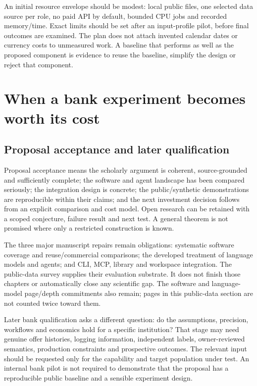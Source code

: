 An initial resource envelope should be modest: local public files, one
selected data source per role, no paid API by default, bounded CPU jobs
and recorded memory/time. Exact limits should be set after an
input-profile pilot, before final outcomes are examined. The plan does
not attach invented calendar dates or currency costs to unmeasured work.
A baseline that performs as well as the proposed component is evidence
to reuse the baseline, simplify the design or reject that component.

\hypertarget{pd15:investment}{%
\chapter{When a bank experiment becomes worth its
cost}\label{pd15:investment}}

\hypertarget{proposal-acceptance-and-later-qualification}{%
\section{Proposal acceptance and later
qualification}\label{proposal-acceptance-and-later-qualification}}

Proposal acceptance means the scholarly argument is coherent,
source-grounded and sufficiently complete; the software and agent
landscape has been compared seriously; the integration design is
concrete; the public/synthetic demonstrations are reproducible within
their claims; and the next investment decision follows from an explicit
comparison and cost model. Open research can be retained with a scoped
conjecture, failure result and next test. A general theorem is not
promised where only a restricted construction is known.

The three major manuscript repairs remain obligations: systematic
software coverage and reuse/commercial comparisons; the developed
treatment of language models and agents; and CLI, MCP, library and
workspace integration. The public-data survey supplies their evaluation
substrate. It does not finish those chapters or automatically close any
scientific gap. The software and language-model page/depth commitments
also remain; pages in this public-data section are not counted twice
toward them.

Later bank qualification asks a different question: do the assumptions,
precision, workflows and economics hold for a specific institution? That
stage may need genuine offer histories, logging information, independent
labels, owner-reviewed semantics, production constraints and prospective
outcomes. The relevant input should be requested only for the capability
and target population under test. An internal bank pilot is not required
to demonstrate that the proposal has a reproducible public baseline and
a sensible experiment design.

